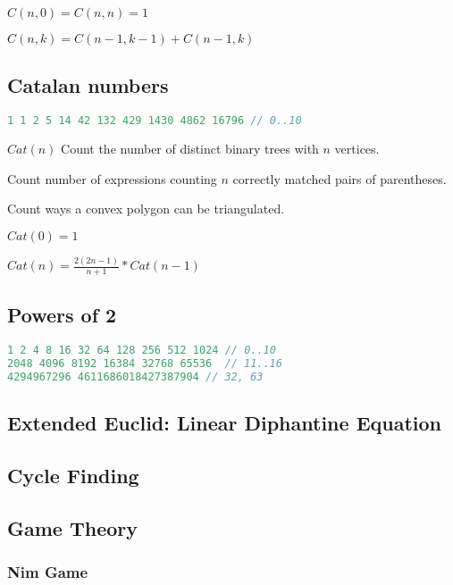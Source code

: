 \documentclass[a4paper,landscape,8pt]{article}
\begin{document}
\begin{multicols}{2}
$C(n,0) = C(n,n) = 1$

$C(n,k) = C(n - 1, k - 1) + C(n - 1, k)$

\subsection{Catalan numbers}

\begin{lstlisting}[language=C++]
1 1 2 5 14 42 132 429 1430 4862 16796 // 0..10
\end{lstlisting}

\begin{enumerate*}
    \item $Cat(n)$ Count the number of distinct binary trees with $n$ vertices.
    \item Count number of expressions counting $n$ correctly matched pairs of parentheses.
    \item Count ways a convex polygon can be triangulated.
\end{enumerate*}

$Cat(0) = 1$

$Cat(n) = \frac{2(2n - 1)}{n + 1} * Cat(n - 1)$

\subsection{Powers of 2}
\begin{lstlisting}[language=C++]
1 2 4 8 16 32 64 128 256 512 1024 // 0..10
2048 4096 8192 16384 32768 65536  // 11..16
4294967296 4611686018427387904 // 32, 63
\end{lstlisting}

\subsection{Extended Euclid: Linear Diphantine Equation}


\subsection{Cycle Finding}


\subsection{Game Theory}

\subsubsection{Nim Game}


\end{multicols}
\end{document}
